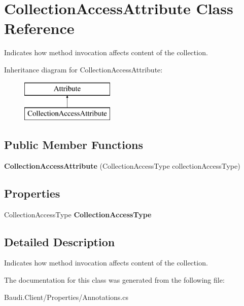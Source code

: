 \hypertarget{class_collection_access_attribute}{}\section{Collection\+Access\+Attribute Class Reference}
\label{class_collection_access_attribute}


Indicates how method invocation affects content of the collection.  


Inheritance diagram for Collection\+Access\+Attribute\+:\begin{figure}[H]
\begin{center}
\leavevmode
\includegraphics[height=2.000000cm]{class_collection_access_attribute}
\end{center}
\end{figure}
\subsection*{Public Member Functions}
\begin{DoxyCompactItemize}
\item 
\hypertarget{class_collection_access_attribute_a14445128bbc836c5876b84ac71307e91}{}{\bfseries Collection\+Access\+Attribute} (Collection\+Access\+Type collection\+Access\+Type)\label{class_collection_access_attribute_a14445128bbc836c5876b84ac71307e91}

\end{DoxyCompactItemize}
\subsection*{Properties}
\begin{DoxyCompactItemize}
\item 
\hypertarget{class_collection_access_attribute_a6f4227ee9e50c5103d73637cef1a3a9e}{}Collection\+Access\+Type {\bfseries Collection\+Access\+Type}\label{class_collection_access_attribute_a6f4227ee9e50c5103d73637cef1a3a9e}

\end{DoxyCompactItemize}


\subsection{Detailed Description}
Indicates how method invocation affects content of the collection. 



The documentation for this class was generated from the following file\+:\begin{DoxyCompactItemize}
\item 
Baudi.\+Client/\+Properties/Annotations.\+cs\end{DoxyCompactItemize}
